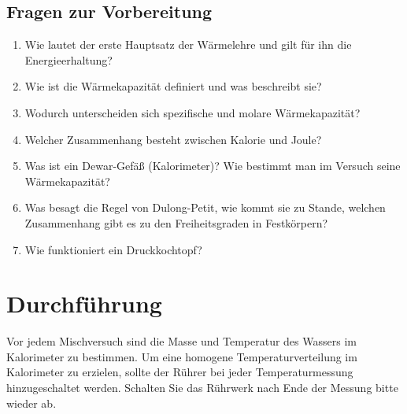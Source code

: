 \begin{tutorhint}
\section{Fragen zur Vorbereitung}

\begin{enumerate} 
 \item Wie lautet der erste Hauptsatz der Wärmelehre und gilt für ihn die Energieerhaltung?
 \item Wie ist die Wärmekapazität definiert und was beschreibt sie?
 \item Wodurch unterscheiden sich spezifische und molare Wärmekapazität?
 \item Welcher Zusammenhang besteht zwischen Kalorie und Joule?
 \item Was ist ein Dewar-Gefäß (Kalorimeter)? Wie bestimmt man im Versuch seine Wärmekapazität?
 \item Was besagt die Regel von Dulong-Petit, wie kommt sie zu Stande, welchen Zusammenhang gibt es zu den Freiheitsgraden in Festkörpern?
 \item Wie funktioniert ein Druckkochtopf?
\end{enumerate} 
\end{tutorhint}

\section{Durchführung} 

Vor jedem Mischversuch sind die Masse und Temperatur des Wassers im Kalorimeter zu bestimmen. Um eine homogene Temperaturverteilung im Kalorimeter zu erzielen, sollte der Rührer bei jeder Temperaturmessung hinzugeschaltet werden. Schalten Sie das Rührwerk nach Ende der Messung bitte wieder ab.\\


